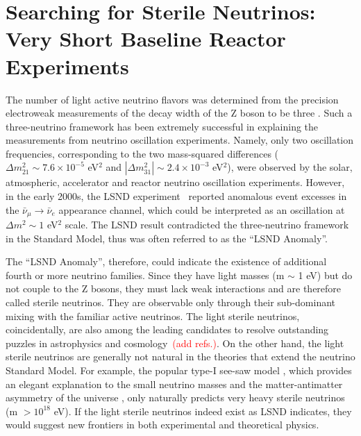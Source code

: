 \section{Searching for Sterile Neutrinos: Very Short Baseline Reactor Experiments}

The number of light active neutrino flavors was determined from the precision electroweak measurements of the decay width of the Z boson to be three \cite{EW-2005}. 
Such a three-neutrino framework has been extremely successful in explaining the measurements from neutrino oscillation experiments. 
Namely, only two oscillation frequencies, corresponding to the two mass-squared differences ($\Delta m_{21}^2\sim7.6\times10^{-5}$ eV$^2$ and $|\Delta m_{31}^2|\sim2.4\times10^{-3}$ eV$^2$), were observed by the solar, atmospheric, accelerator and reactor neutrino oscillation experiments. 
However, in the early 2000s, the LSND experiment~\cite{LSND2001} reported anomalous event excesses in the $\bar\nu_\mu\rightarrow\bar\nu_e$ appearance channel, which could be interpreted as an oscillation at $\Delta m^2\sim1$ eV$^2$ scale. 
The LSND result contradicted the three-neutrino framework in the Standard Model, thus was often referred to as the ``LSND Anomaly''.

The ``LSND Anomaly'', therefore, could indicate the existence of additional
fourth or more neutrino families. 
Since they have light masses (m $\sim$ 1 eV) but do not couple to the Z bosons, they must lack weak interactions and are therefore called sterile neutrinos. 
They are observable only through their sub-dominant mixing with the familiar active neutrinos. 
The light sterile neutrinos, coincidentally, are also among the leading candidates to resolve outstanding puzzles in astrophysics and cosmology~\textcolor{red}{(add refs.)}.
On the other hand, the light sterile neutrinos are generally not natural in the theories that extend the neutrino Standard Model. 
For example, the popular type-I see-saw model \cite{SeeSaw}, which provides an elegant explanation to the small neutrino masses and the matter-antimatter asymmetry of the universe \cite{leptogenesis}, only naturally predicts very heavy sterile neutrinos (m $>10^{18}$ eV).
If the light sterile neutrinos indeed exist as LSND indicates, they would suggest new frontiers in both experimental and theoretical physics.

